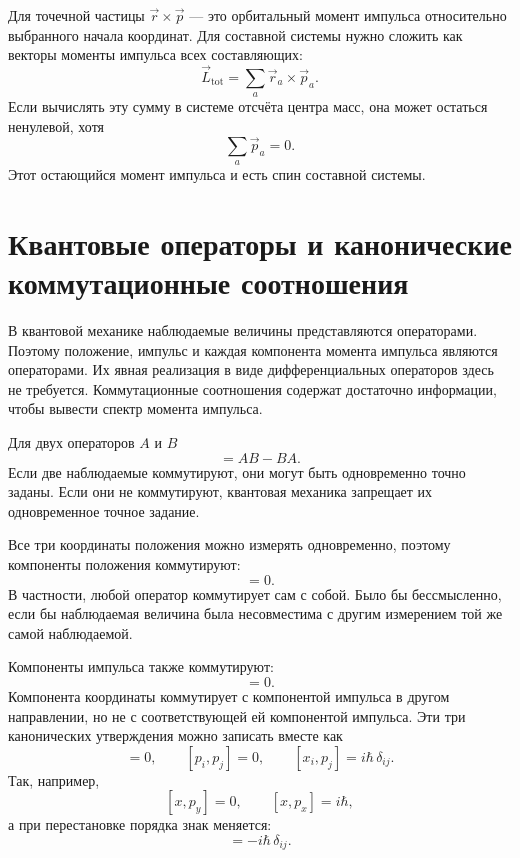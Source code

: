 Для точечной частицы \(\vec r\times\vec p\) — это орбитальный момент импульса относительно выбранного начала координат. Для составной системы нужно сложить как векторы моменты импульса всех составляющих:
\begin{equation}
\vec L_{\mathrm{tot}}=\sum_a \vec r_a\times\vec p_a.
\end{equation}
Если вычислять эту сумму в системе отсчёта центра масс, она может остаться ненулевой, хотя
\[
\sum_a\vec p_a=0.
\]
Этот остающийся момент импульса и есть спин составной системы.

\section{Квантовые операторы и канонические коммутационные соотношения}

В квантовой механике наблюдаемые величины представляются операторами. Поэтому положение, импульс и каждая компонента момента импульса являются операторами. Их явная реализация в виде дифференциальных операторов здесь не требуется. Коммутационные соотношения содержат достаточно информации, чтобы вывести спектр момента импульса.

Для двух операторов \(A\) и \(B\)
\begin{equation}
[A,B]=AB-BA.
\end{equation}
Если две наблюдаемые коммутируют, они могут быть одновременно точно заданы. Если они не коммутируют, квантовая механика запрещает их одновременное точное задание.

Все три координаты положения можно измерять одновременно, поэтому компоненты положения коммутируют:
\begin{equation}
[x_i,x_j]=0.
\end{equation}
В частности, любой оператор коммутирует сам с собой. Было бы бессмысленно, если бы наблюдаемая величина была несовместима с другим измерением той же самой наблюдаемой.

Компоненты импульса также коммутируют:
\begin{equation}
[p_i,p_j]=0.
\end{equation}
Компонента координаты коммутирует с компонентой импульса в другом направлении, но не с соответствующей ей компонентой импульса. Эти три канонических утверждения можно записать вместе как
\begin{equation}
[x_i,x_j]=0,\qquad
[p_i,p_j]=0,\qquad
[x_i,p_j]=i\hbar\,\delta_{ij}.
\end{equation}
Так, например,
\[
[x,p_y]=0,\qquad [x,p_x]=i\hbar,
\]
а при перестановке порядка знак меняется:
\begin{equation}
[p_j,x_i]=-i\hbar\,\delta_{ij}.
\end{equation}

